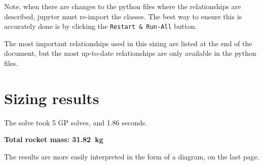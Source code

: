 \documentclass[12pt]{article}
\begin{document}
Note, when there are changes to the python files where the relationships are described, jupyter must re-import the classes. The best way to ensure this is accurately done is by clicking the \texttt{Restart \& Run-All} button. 

The most important relationships used in this sizing are listed at the end of the document, but the most up-to-date relationships are only available in the python files. 


\section{Sizing results}

The solve  took 5 GP solves, and 1.86 seconds. 

\textbf{Total rocket mass: 31.82~kg}

The results are more easily interpreted in the form of a diagram, on the last page.
\end{document}
